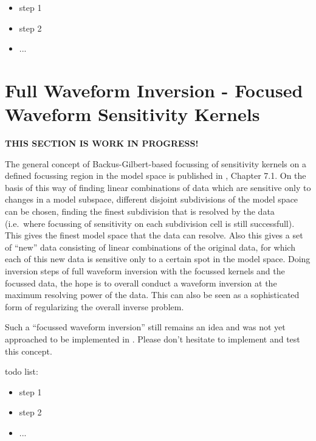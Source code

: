 \begin{itemize}
\item step 1
\item step 2
\item ...
\end{itemize}
%
\newpage
\section{Full Waveform Inversion - Focused Waveform Sensitivity Kernels} \label{guide,sec:focused_inversion}
%
{\bf THIS SECTION IS WORK IN PROGRESS!}

The general concept of Backus-Gilbert-based focussing of sensitivity kernels on a defined focussing region 
in the model space is published in \cite{_743d334d-dfa4-4a16-8cc5-91cdadc95271}, Chapter 7.1. On the basis
of this way of finding linear combinations of data which are sensitive only to changes in a model subspace, 
different disjoint subdivisions of the model space can be chosen, finding the finest subdivision that
is resolved by the data (i.e.\ where focussing of sensitivity on each subdivision cell is still successfull).
This gives the finest model space that the data can resolve. Also this gives a set of ``new'' data consisting of
linear combinations of the original data, for which each of this new data is sensitive only to a certain
spot in the model space. Doing inversion steps of full waveform inversion with the focussed kernels and the 
focussed data, the hope is to overall conduct a waveform inversion at the maximum resolving power of the data. 
This can also be seen as a sophisticated form of regularizing the overall inverse problem. 

Such a ``focussed waveform inversion'' still remains an idea and was not yet approached to be implemented
in \ASKI{}. Please don't hesitate to implement and test this concept.

todo list:
\begin{itemize}
\item step 1
\item step 2
\item ...
\end{itemize}

